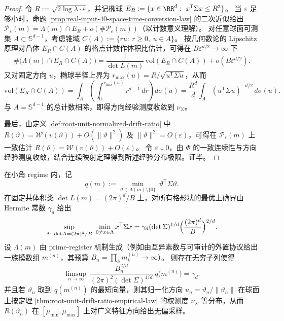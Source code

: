 \begin{proof}
令 \(R:=\sqrt{2\log\lambda\cdot\varepsilon}\)，并记椭球
\(
E_R:=\{x\in\RR^d:\ x^{\mathsf T}\Sigma x\le R^2\}
\)。
当 \(\varepsilon\) 足够小时，命题 \ref{prop:real-input-40-space-time-conversion-law} 的二次近似给出
\(
\mathcal P_{\varepsilon}(m)=\Lambda(m)\cap E_R+o(\#\mathcal P_{\varepsilon}(m))
\)（以计数意义理解）。
对任意球面可测集 \(A\subset\mathbb S^{d-1}\)，考虑锥域 \(C(A):=\{ru:\ r\ge 0,\ u\in A\}\)。
按几何数论的 Lipschitz 原理对凸体 \(E_R\cap C(A)\) 的格点计数作体积比估计，可得在 \(B\varepsilon^{d/2}\to\infty\) 下
\[
\#\bigl(\Lambda(m)\cap E_R\cap C(A)\bigr)
=\frac{1}{\det L(m)}\,\mathrm{vol}(E_R\cap C(A))+o(B\varepsilon^{d/2}).
\]
又对固定方向 \(u\)，椭球半径上界为 \(r_{\max}(u)=R/\sqrt{u^{\mathsf T}\Sigma u}\)，从而
\[
\mathrm{vol}(E_R\cap C(A))
=\int_A\left(\int_0^{r_{\max}(u)} r^{d-1}\,dr\right)d\sigma(u)
=\frac{R^d}{d}\int_A (u^{\mathsf T}\Sigma u)^{-d/2}\,d\sigma(u).
\]
与 \(A=\mathbb S^{d-1}\) 的总计数相除，即得方向经验测度收敛到 \(\nu_{\Sigma}\)。
\par
最后，由定义 \ref{def:root-unit-normalized-drift-ratio} 中 \(R(\vartheta)=\mathcal{W}(v(\vartheta))+O(\|\vartheta\|^2)\) 及 \(\|\vartheta\|^2=O(\varepsilon)\)，可得在 \(\mathcal P_{\varepsilon}(m)\) 上一致估计 \(R(\vartheta)=\mathcal{W}(v(\vartheta))+O(\varepsilon)\)。
令 \(\varepsilon\downarrow 0\)，由 \(\Phi\) 的一致连续性与方向经验测度收敛，结合连续映射定理得到所述经验分布极限。证毕。
\end{proof}

\begin{conjecture}\label{conj:root-unit-prime-register-hermite-saturation}
在小角 regime 内，记
\[
q(m):=\min_{\vartheta\in\Lambda(m)\setminus\{0\}}\ \vartheta^{\mathsf T}\Sigma\vartheta.
\]
在固定共体积类 \(\det L(m)=(2\pi)^d/B\) 上，对所有格形状的最优上确界由 Hermite 常数 \(\gamma_d\) 给出
\[
\sup_{\Lambda:\ \det\Lambda=(2\pi)^d/B}\ \min_{0\ne x\in\Lambda} x^{\mathsf T}\Sigma x
=\gamma_d(\det\Sigma)^{1/d}\Bigl(\frac{(2\pi)^d}{B}\Bigr)^{2/d}.
\]
设 \(\Lambda(m)\) 由 prime-register 机制生成（例如由互异素数与可审计的外置协议给出一族模数组 \(m^{(n)}\)，其预算 \(B_n=\prod_k m^{(n)}_k\to\infty\)）。
则存在无穷子列使得
\[
\limsup_{n\to\infty}\ \frac{B_n^{2/d}}{(2\pi)^2(\det\Sigma)^{1/d}}\ q\bigl(m^{(n)}\bigr)=\gamma_d.
\]
并且若 \(\vartheta_n\) 取到 \(q(m^{(n)})\) 的最短向量，则其归一化方向 \(u_n=\vartheta_n/\|\vartheta_n\|\) 在球面上按定理 \ref{thm:root-unit-drift-ratio-empirical-law} 的权测度 \(\nu_{\Sigma}\) 等分布，从而 \(R(\vartheta_n)\) 在 \([\mu_{\min},\mu_{\max}]\) 上对广义特征方向给出无偏采样。
\end{conjecture}

